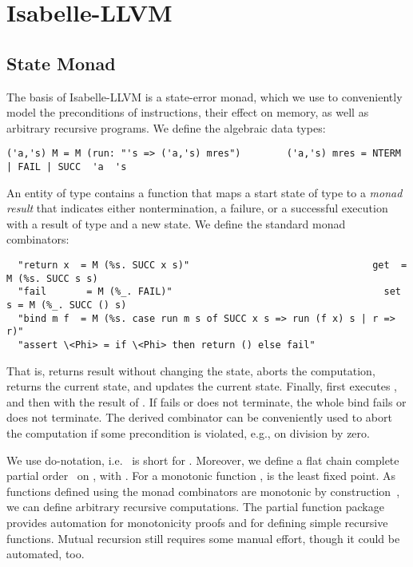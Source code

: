 \documentclass[a4paper,USenglish,cleveref, autoref]{lipics-v2019}
\begin{document}
\section{Isabelle-LLVM}\label{sec:semantics}
\subsection{State Monad}
The basis of Isabelle-LLVM is a state-error monad, which we use to conveniently model the preconditions of instructions, their effect 
on memory, as well as arbitrary recursive programs. We define the algebraic data types:
\begin{lstlisting}
('a,'s) M = M (run: "'s => ('a,'s) mres")        ('a,'s) mres = NTERM | FAIL | SUCC  'a  's
\end{lstlisting}
An entity of type  contains a function  that maps a start state of type  to 
a \emph{monad result} that indicates either nontermination, a failure, or a successful execution with a result of type  and a new state.
We define the standard monad combinators:
\begin{lstlisting}
  "return x  = M (%s. SUCC x s)"                                get  = M (%s. SUCC s s)
  "fail       = M (%_. FAIL)"                                     set s = M (%_. SUCC () s)
  "bind m f  = M (%s. case run m s of SUCC x s => run (f x) s | r => r)"
  "assert \<Phi> = if \<Phi> then return () else fail"
\end{lstlisting}
That is,  returns result  without changing the state,  aborts the computation,
 returns the current state, and  updates the current state.
Finally,  first executes , and then  with the result of .
If  fails or does not terminate, the whole bind fails or does not terminate.  
The derived  combinator can be conveniently used to abort the computation 
if some precondition is violated, e.g., on division by zero.

We use do-notation, i.e.\  is short for .
Moreover, we define a flat chain complete partial order~\cite{Mark76} on , with .
For a monotonic function ,  is the least fixed point.
As functions defined using the monad combinators are monotonic by construction~\cite{Kr10}, 
we can define arbitrary recursive computations. The partial function package~\cite{Kr10} provides automation for monotonicity 
proofs and for defining simple recursive functions. Mutual recursion still requires some manual effort, though it could be automated, too.
\end{document}
